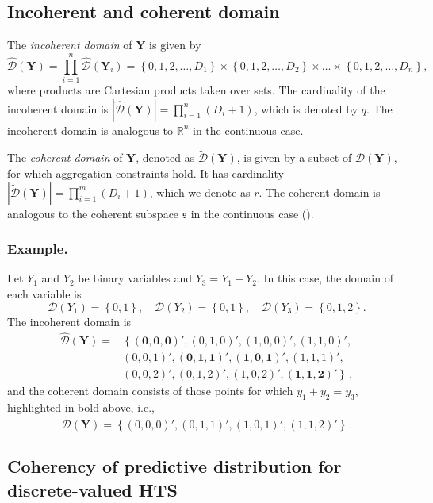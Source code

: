 \documentclass[a4paper,review,12pt,authoryear]{elsarticle}
\newcommand{\bY}{\mathbf{Y}}
\begin{document}
\subsection{Incoherent and coherent domain}\label{sec:domains}
The \textit{incoherent domain} of $\bY$ is given by
\[
\hat{\mathcal D}(\bY)=\prod\limits_{i=1}^n\hat{\mathcal D}(\bY_i)=\left\{0, 1,2,\dots,D_1\right\}\times\left\{0,1,2,\dots,D_2\right\}\times\dots\times\left\{0,1,2,\dots,D_n\right\},
\] 
where products are Cartesian products taken over sets. 
The cardinality of the incoherent domain is $|\hat{\mathcal D}(\bY)|=\prod\limits_{i=1}^{n} (D_i+1)$, which is denoted by $q$. 
The incoherent domain is analogous to $\mathbb{R}^n$ in the continuous case.
  
The \textit{coherent domain} of $\bY$, denoted as $\tilde{\mathcal D}(\bY)$, is given by a subset of $\hat{\mathcal D}(\bY)$, for which aggregation constraints hold.  
It has cardinality $|\tilde{\mathcal D}(\bY)|=\prod\limits_{i=1}^{m} (D_i+1)$, which we denote as $r$. 
The coherent domain is analogous to the coherent subspace $\mathfrak{s}$ in the continuous case (\citealp{panagiotelisProbabilisticForecastReconciliation2022}).
  
  \subsubsection*{\textbf{Example}.}
  \label{sec:example}
  
  Let $Y_1$ and $Y_2$ be binary variables and $Y_3=Y_1+Y_2$. In this case, the domain of each variable is
  \[
    \mathcal{D}(Y_1)=\left\{0,1\right\},\quad
    \mathcal{D}(Y_2)=\left\{0,1\right\},\quad
    \mathcal{D}(Y_3)=\left\{0,1,2\right\}.
  \]   
  The incoherent domain is
  \begin{align*}
  \hat{\mathcal D}(\bY)=&\left\{\mathbf{(0,0,0)'},(0,1,0)',(1,0,0)',(1,1,0)',\right.\\
  &\left.(0,0,1)',\mathbf{(0,1,1)'},\mathbf{(1,0,1)'},(1,1,1)',\right.\\
  &\left.(0,0,2)',(0,1,2)',(1,0,2)',\mathbf{(1,1,2)'}\right\}\,,
  \end{align*}
  and the coherent domain consists of those points for which $y_1+y_2=y_3$, highlighted in bold above, i.e.,
  \[
      \tilde{\mathcal D}(\bY)=\left\{(0,0,0)',(0,1,1)',(1,0,1)',(1,1,2)'\right\}\,.
  \]
    
  \subsection{Coherency of predictive distribution for discrete-valued HTS}
  
\end{document}

